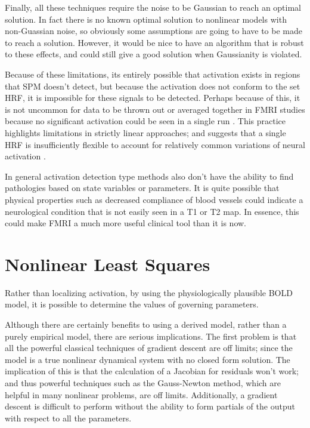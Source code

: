 Finally, all these techniques require the noise to be Gaussian to reach
an optimal solution. In fact there is no known optimal solution to
nonlinear models with non-Guassian noise, so obviously some assumptions
are going to have to be made to reach a solution. However, it would be
nice to have an algorithm that is robust to these effects, and could
still give a good solution when Gaussianity is violated.

Because of these limitations, its entirely possible that activation exists
in regions that SPM doesn't detect, but because the activation does not conform
to the set HRF, it is impossible for these signals to be detected. Perhaps
because of this, it is not uncommon for data to be thrown out or averaged
together in FMRI studies because 
no significant activation could be seen in a single run \cite{Riera2004}
\cite{Johnston2008}. This practice highlights 
limitations in strictly linear approaches; and suggests that a single HRF is 
insufficiently flexible to account for relatively common variations of neural activation
\cite{Handwerker2004}. 

In general activation detection type methods also don't have the ability 
to find pathologies based on state variables or parameters.  It
is quite possible that physical properties such as decreased compliance of
blood vessels could indicate a neurological condition that is not easily
seen in a T1 or T2 map. In essence, this could make FMRI a much more 
useful clinical tool than it is now. 

\section{Nonlinear Least Squares}
\label{sec:Nonlinear Least Squares}
Rather than localizing activation, by using the physiologically
plausible BOLD model, it is possible to determine the values of
governing parameters.

Although there are certainly benefits to using a derived model, rather
than a purely empirical model, there are serious implications. The
first problem is that all the powerful classical techniques of gradient
descent are off limits; since the model is a true nonlinear dynamical
system with no closed form solution. The implication of this is that
the calculation of a Jacobian for residuals won't work; and thus powerful
techniques such as the Gauss-Newton method, which are helpful in many nonlinear
problems, are off limits. Additionally, a gradient descent is difficult to
perform without the ability to form partials of the output with respect
to all the parameters. 

